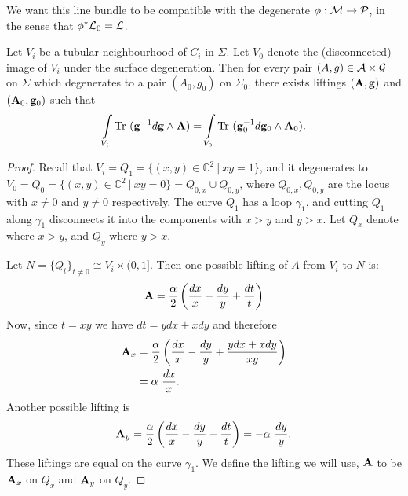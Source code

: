 	We want this line bundle to be compatible with the degenerate $\phi:\mathcal{M}\to\mathcal{P}$, in the sense that $\phi^\ast \mathcal{L}_0 = \mathcal{L}$.
	\begin{lemma}
		Let $V_i$ be a tubular neighbourhood of $C_i$ in $\Sigma$. Let $V_{0}$ denote the (disconnected) image of $V_i$ under the surface degeneration. Then for every pair $(A,g)\in\mathcal{A}\times \mathcal{G}$ on $\Sigma$ which degenerates to a pair $(A_0, g_0)$ on $\Sigma_0$, there exists liftings $(\mathbf{A},\mathbf{g})$ and $(\mathbf{A}_0,\mathbf{g}_0)$ such that
		\begin{equation}
			\int\limits_{V_i} \text{Tr }(\mathbf{g}^{-1}d\mathbf{g}\wedge \mathbf{A}) = \int\limits_{V_0} \text{Tr }(\mathbf{g}_0^{-1}d\mathbf{g}_0\wedge \mathbf{A}_0).
		\end{equation}
		\label{l:main-lemma}
	\end{lemma}
	\begin{proof}
		Recall that $V_i=Q_1 = \{(x,y)\in \mathbb{C}^2~|~ xy=1\}$, and it degenerates to $V_0 = Q_0 = \{(x,y)\in\mathbb{C}^2~|~xy=0\} = Q_{0,x} \cup Q_{0,y}$, where $Q_{0,x},Q_{0,y}$ are the locus with $x\neq0$ and $y\neq 0$ respectively. The curve $Q_1$ has a loop $\gamma_1$, and cutting $Q_1$ along $\gamma_1$ disconnects it into the components with $x>y$ and $y>x$. Let $Q_x$ denote where $x>y$, and $Q_y$ where $y>x$.
		
		Let $N=\{Q_t\}_{t\neq 0}\cong V_i\times(0,1]$. Then one possible lifting of $A$ from $V_i$ to $N$ is:
		\begin{equation}
			\mathbf{A} = \frac{\alpha}{2}\left(\frac{dx}{x}-\frac{dy}{y} + \frac{dt}{t}\right)
		\end{equation}
		Now, since $t=xy$ we have $dt =ydx+xdy$ and therefore
		\begin{align*}
			\mathbf{A}_x &= \frac{\alpha}{2}\left(\frac{dx}{x}-\frac{dy}{y} + \frac{ydx+xdy}{xy}\right)\\
			&= \alpha~ \frac{dx}{x}.
		\end{align*}
		Another possible lifting is 
		\begin{equation}
			\mathbf{A}_y = \frac{\alpha}{2}\left(\frac{dx}{x}-\frac{dy}{y} -  \frac{dt}{t}\right) = -\alpha~\frac{dy}{y}.
		\end{equation}
		These liftings are equal on the curve $\gamma_1$. We define the lifting we will use, $\mathbf{A}$ to be $\mathbf{A}_x$ on $Q_x$ and $\mathbf{A}_y$ on $Q_y$.
		

\end{proof}
